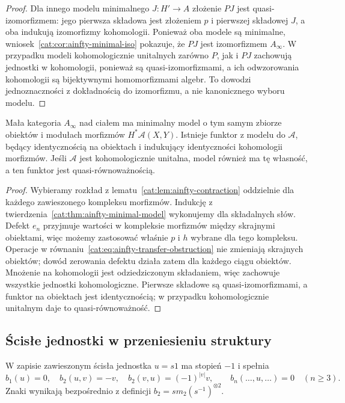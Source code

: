 \begin{proof}
Dla innego modelu minimalnego $J:H'\to A$ złożenie $PJ$ jest quasi-izomorfizmem: jego pierwsza składowa jest złożeniem $p$ i pierwszej składowej $J$, a oba indukują izomorfizmy kohomologii. Ponieważ oba modele są minimalne, wniosek~\ref{cat:cor:ainfty-minimal-iso} pokazuje, że $PJ$ jest izomorfizmem $A_\infty$. W przypadku modeli kohomologicznie unitalnych zarówno $P$, jak i $PJ$ zachowują jednostki w kohomologii, ponieważ są quasi-izomorfizmami, a ich odwzorowania kohomologii są bijektywnymi homomorfizmami algebr. To dowodzi jednoznaczności z dokładnością do izomorfizmu, a nie kanonicznego wyboru modelu.
\end{proof}

\begin{wniosek}\label{cat:cor:ainfty-category-minimal}
Mała kategoria $A_\infty$ nad ciałem ma minimalny model o tym samym zbiorze obiektów i modułach morfizmów $H^*\mathcal A(X,Y)$. Istnieje funktor z modelu do $\mathcal A$, będący identycznością na obiektach i indukujący identyczności kohomologii morfizmów. Jeśli $\mathcal A$ jest kohomologicznie unitalna, model również ma tę własność, a ten funktor jest quasi-równoważnością.
\end{wniosek}
\begin{proof}
Wybieramy rozkład z lematu~\ref{cat:lem:ainfty-contraction} oddzielnie dla każdego zawieszonego kompleksu morfizmów. Indukcję z twierdzenia~\ref{cat:thm:ainfty-minimal-model} wykonujemy dla składalnych słów. Defekt $e_n$ przyjmuje wartości w kompleksie morfizmów między skrajnymi obiektami, więc możemy zastosować właśnie $p$ i $h$ wybrane dla tego kompleksu. Operacje w równaniu~\eqref{cat:eq:ainfty-transfer-obstruction} nie zmieniają skrajnych obiektów; dowód zerowania defektu działa zatem dla każdego ciągu obiektów. Mnożenie na kohomologii jest odziedziczonym składaniem, więc zachowuje wszystkie jednostki kohomologiczne. Pierwsze składowe są quasi-izomorfizmami, a funktor na obiektach jest identycznością; w przypadku kohomologicznie unitalnym daje to quasi-równoważność.
\end{proof}

\subsection{Ścisłe jednostki w przeniesieniu struktury}

W zapisie zawieszonym ścisła jednostka $u=s1$ ma stopień $-1$ i spełnia
\[
 b_1(u)=0,\quad b_2(u,v)=-v,\quad b_2(v,u)=(-1)^{|v|}v,
 \qquad b_n(\ldots,u,\ldots)=0\quad(n\geq3).
\]
Znaki wynikają bezpośrednio z definicji $b_2=s m_2(s^{-1})^{\otimes2}$.

